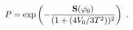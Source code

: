 \begin{equation}\label{thin}
P = \exp\left({-{{\bf S}(\varphi_0) \over (1 + ( 4V_0 /3T^2) )^{2}}}\right)
\ .
\end{equation}

